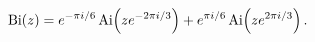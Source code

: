 \[\mathop{\mathrm{Bi}\/}\nolimits\!\left(z\right)=e^{-\pi i/6}\mathop{\mathrm{Ai%
}\/}\nolimits\!\left(ze^{-2\pi i/3}\right)+e^{\pi i/6}\mathop{\mathrm{Ai}\/}%
\nolimits\!\left(ze^{2\pi i/3}\right).\]
